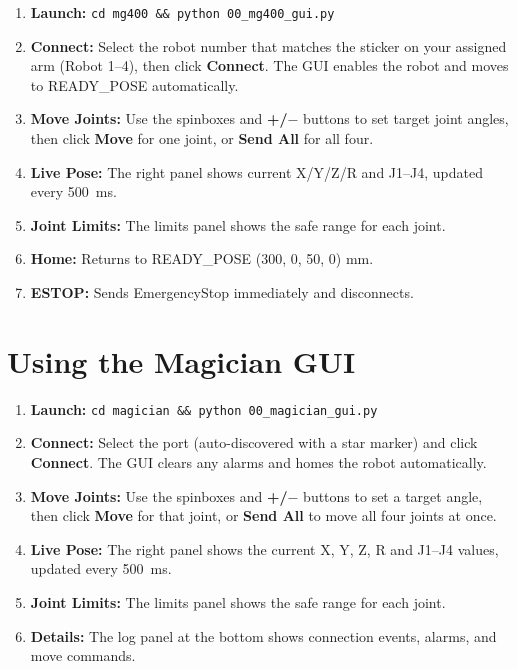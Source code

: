 \documentclass[11pt,a4paper]{article}
\begin{document}
\begin{enumerate}
  \item \textbf{Launch:} \texttt{cd mg400 \&\& python 00\_mg400\_gui.py}
  \item \textbf{Connect:} Select the robot number that matches the sticker on your assigned arm
        (Robot 1--4), then click
        \textbf{Connect}. The GUI enables the robot and moves to READY\_POSE automatically.
  \item \textbf{Move Joints:} Use the spinboxes and \textbf{+/$-$} buttons to set target
        joint angles, then click \textbf{Move} for one joint, or \textbf{Send All} for all four.
  \item \textbf{Live Pose:} The right panel shows current X/Y/Z/R and J1--J4, updated every
        \qty{500}{\ms}.
  \item \textbf{Joint Limits:} The limits panel shows the safe range for each joint.
  \item \textbf{Home:} Returns to READY\_POSE (300, 0, 50, 0) mm.
  \item \textbf{ESTOP:} Sends EmergencyStop immediately and disconnects.
\end{enumerate}

\section{Using the Magician GUI}

\begin{enumerate}
  \item \textbf{Launch:} \texttt{cd magician \&\& python 00\_magician\_gui.py}
  \item \textbf{Connect:} Select the port (auto-discovered with a star marker) and click \textbf{Connect}. The GUI clears any alarms and homes the robot automatically.
  \item \textbf{Move Joints:} Use the spinboxes and \textbf{+/$-$} buttons to set a target angle, then click \textbf{Move} for that joint, or \textbf{Send All} to move all four joints at once.
  \item \textbf{Live Pose:} The right panel shows the current X, Y, Z, R and J1--J4 values, updated every \qty{500}{\ms}.
  \item \textbf{Joint Limits:} The limits panel shows the safe range for each joint.
  \item \textbf{Details:} The log panel at the bottom shows connection events, alarms, and move commands.
\end{enumerate}
\end{document}
